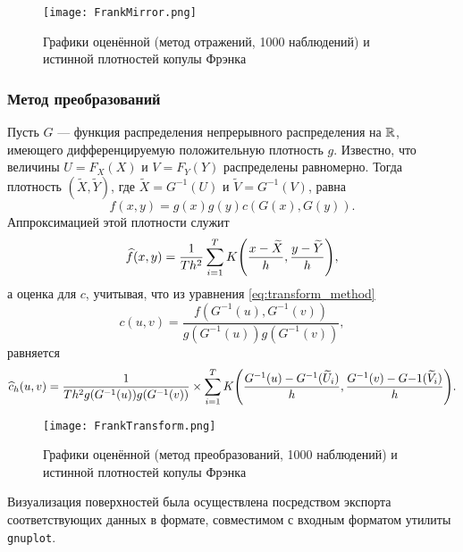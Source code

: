 \begin{figure}[h]
  \centering
  \texttt{[image: FrankMirror.png]}
  \caption{Графики оценённой (метод отражений, 1000 наблюдений) и истинной плотностей копулы Фрэнка}
\end{figure}

\subsubsection*{Метод преобразований}

Пусть $G$ --- функция распределения непрерывного распределения на $\mathbb{R}$, имеющего дифференцируемую положительную плотность $g$. Известно, что величины $U = F_X(X)$ и $V = F_Y(Y)$ распределены равномерно. Тогда плотность $(\widetilde{X}, \widetilde{Y})$, где $\widetilde{X} = G^{-1}(U)$ и $\widetilde{V} = G^{-1}(V)$, равна
\begin{equation}\label{eq:transform_method}
f(x, y) = g(x)g(y)c(G(x), G(y)).
\end{equation}
Аппроксимацией этой плотности служит
\begin{equation}
\widehat{f}(x, y) = \frac{1}{T h^2} \sum_{i=1}^T K\brts*{\frac{x - \widetilde{X}}{h}, \frac{y - \widetilde{Y}}{h}},
\end{equation}
а оценка для $c$, учитывая, что из уравнения \eqref{eq:transform_method}
\begin{equation}
c(u, v) = \frac{f(G^{-1}(u), G^{-1}(v))}{g(G^{-1}(u))g(G^{-1}(v))},
\end{equation}
равняется
\begin{equation}
  \widehat{c}_h(u, v) = \frac{1}{T h^2 g(G^{-1}(u))g(G^{-1}(v))} \times \sum_{i=1}^T K\brts*{\frac{G^{-1}(u) - G^{-1}(\widetilde{U}_i)}{h}, \frac{G^{-1}(v) - G{-1}(\widetilde{V}_i)}{h}}.
\end{equation}

\begin{figure}[h]
  \centering
  \texttt{[image: FrankTransform.png]}
  \caption{Графики оценённой (метод преобразований, 1000 наблюдений) и истинной плотностей копулы Фрэнка}
\end{figure}

Визуализация поверхностей была осуществлена посредством экспорта соответствующих данных в формате, совместимом с входным форматом утилиты \texttt{gnuplot}.

\clearpage

